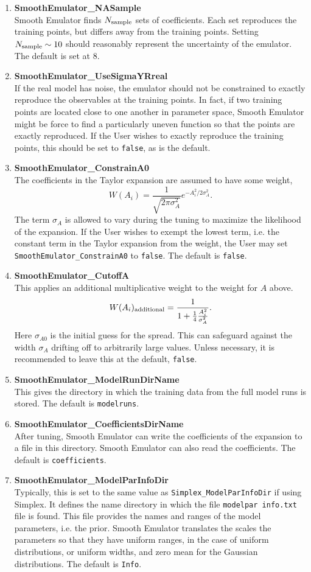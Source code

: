 \documentclass[main.tex]{subfiles}
\begin{document}
\begin{enumerate}
\item {\bf SmoothEmulator\_NASample}\\
Smooth Emulator finds $N_{\rm sample}$ sets of coefficients. Each set reproduces the training points, but differs away from the training points. Setting $N_{\rm sample}\sim 10$ should reasonably represent the uncertainty of the emulator. The default is set at 8.
\item {\bf SmoothEmulator\_UseSigmaYRreal}\\
If the real model has noise, the emulator should not be constrained to exactly reproduce the observables at the training points. In fact, if two training points are located close to one another in parameter space, Smooth Emulator might be force to find a particularly uneven function so that the points are exactly reproduced. If the User wishes to exactly reproduce the training points, this should be set to {\tt false}, as is the  default. 
\item {\bf SmoothEmulator\_ConstrainA0}\\
The coefficients in the Taylor expansion are assumed to have some weight,
\[
W(A_i)=\frac{1}{\sqrt{2\pi\sigma_A^2}}e^{-A_i^2/2\sigma_A^2}.
\]
The term $\sigma_A$ is allowed to vary during the tuning to maximize the likelihood of the expansion. If the User wishes to exempt the lowest term, i.e. the constant term in the Taylor expansion from the weight, the User may set {\tt SmoothEmulator\_ConstrainA0} to {\tt false}. The default is {\tt false}.
\item {\bf SmoothEmulator\_CutoffA}\\
This applies an additional multiplicative weight to the weight for $A$ above.
\[
W(A_i)_{\rm additional}=\frac{1}{1+\frac{1}{4}\frac{A_i^2}{\sigma_{A}^2}}.
\] 
Here $\sigma_{A0}$ is the initial guess for the spread. This can safeguard against the width $\sigma_A$ drifting off to arbitrarily large values. Unless necessary, it is recommended to leave this at the default, {\tt false}.
\item {\bf SmoothEmulator\_ModelRunDirName}\\
This gives the directory in which the training data from the full model runs is stored. The default is {\tt modelruns}.
\item {\bf SmoothEmulator\_CoefficientsDirName}\\
After tuning, Smooth Emulator can write the coefficients of the expansion to a file in this directory. Smooth Emulator can also read the coefficients. The default is {\tt coefficients}.
\item {\bf SmoothEmulator\_ModelParInfoDir}\\
Typically, this is set to the same value as {\tt Simplex\_ModelParInfoDir} if using Simplex. It defines the name directory in which the file {\tt modelpar\ info.txt} file is found.  This file provides the names and ranges of the model parameters, i.e. the prior. Smooth Emulator translates the scales the parameters so that they have uniform ranges, in the case of uniform distributions, or uniform widths, and zero mean for the Gaussian distributions. The default is {\tt Info}.


\end{enumerate}
\end{document}
